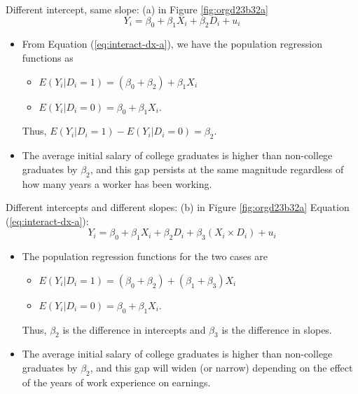 \documentclass[presentation,10pt]{beamer}
\begin{document}
\begin{frame}[label={sec:orgf2fef32}]{Different intercept, same slope: (a) in Figure \ref{fig:orgd23b32a}}
\begin{equation}
\label{eq:interact-dx-a}
Y_i = \beta_0 + \beta_1 X_i + \beta_2 D_i + u_i
\end{equation}

\begin{itemize}
\item From Equation (\ref{eq:interact-dx-a}), we have the population
regression functions as
\begin{itemize}
\item \(E(Y_i | D_i = 1) = (\beta_0 + \beta_2) + \beta_1 X_i\)
\item \(E(Y_i | D_i = 0) = \beta_0 + \beta_1 X_i\).
\end{itemize}
Thus, \(E(Y_i | D_i = 1) - E(Y_i | D_i = 0) = \beta_2\).

\item The average initial salary of college graduates is higher than
non-college graduates by \(\beta_2\), and this gap persists at the same
magnitude regardless of how many years a worker has been working.
\end{itemize}
\end{frame}

\begin{frame}[label={sec:orgd78bab3}]{Different intercepts and different slopes: (b) in Figure \ref{fig:orgd23b32a}}
Equation (\ref{eq:interact-dx-a}):
\begin{equation}
\label{eq:interact-dx-b}
Y_i = \beta_0 + \beta_1 X_i + \beta_2 D_i + \beta_3 (X_i \times D_i) + u_i
\end{equation}

\begin{itemize}
\item The population regression functions for the two cases are
\begin{itemize}
\item \(E(Y_i|D_i=1) = (\beta_0+\beta_2) + (\beta_1 + \beta_3) X_i\)
\item \(E(Y_i|D_i=0) = \beta_0 + \beta_1 X_i\).
\end{itemize}
Thus, \(\beta_2\) is the difference in intercepts and \(\beta_3\) is the
difference in slopes.

\item The average initial salary of college graduates is higher than
non-college graduates by \(\beta_2\), and this gap will widen (or
narrow) depending on the effect of the years of work experience on
earnings.
\end{itemize}
\end{frame}
\end{document}
